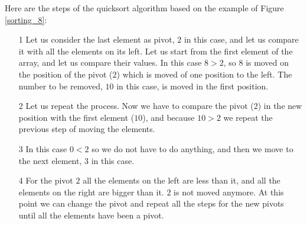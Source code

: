 Here are the steps of the quicksort algorithm based on the example of Figure \ref{sorting_8}:
\begin{itemize}
\item[1] Let us consider the last element as pivot, \(2\) in this case, and let us compare it with all the elements on its left. Let us start from the first element of the array, and let us compare their values. In this case \(8 > 2\), so \(8\) is moved on the position of the pivot (\(2\)) which is moved of one position to the left. The number to be removed, \(10\) in this case, is moved in the first position.
\item[2] Let us repeat the process. Now we have to compare the pivot (\(2\)) in the new position with the first element (\(10\)), and because \(10>2\) we repeat the previous step of moving the elements.
\item[3] In this case \(0<2\) so we do not have to do anything, and then we move to the next element, \(3\) in this case.
\item[4] For the pivot \(2\) all the elements on the left are less than it, and all the elements on the right are bigger than it. \(2\) is not moved anymore. At this point we can change the pivot and repeat all the steps for the new pivots until all the elements have been a pivot.
\end{itemize}

